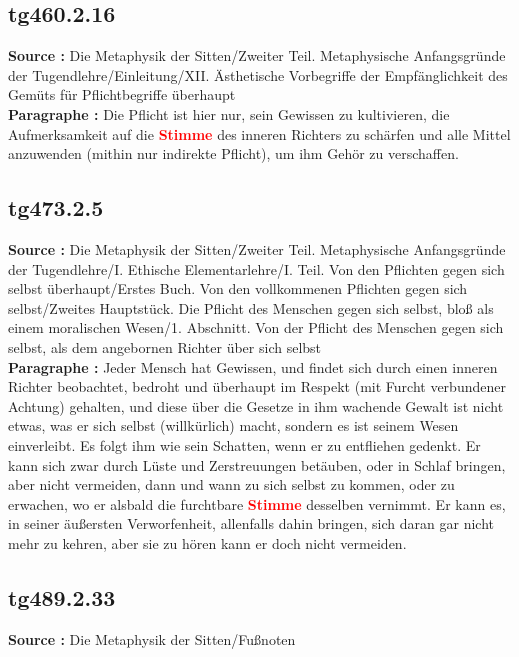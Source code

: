 \documentclass[a4paper,12pt,twoside]{book}
\newcommand{\match}[1]{\textcolor{red}{\textbf{#1}}}
\begin{document}
	\subsection*{tg460.2.16} 
	\textbf{Source : }Die Metaphysik der Sitten/Zweiter Teil. Metaphysische Anfangsgründe der Tugendlehre/Einleitung/XII. Ästhetische Vorbegriffe der Empfänglichkeit des Gemüts für Pflichtbegriffe überhaupt\\  
	
	\textbf{Paragraphe : }Die Pflicht ist hier nur, sein Gewissen zu kultivieren, die Aufmerksamkeit auf die \match{Stimme} des inneren Richters zu schärfen und alle Mittel anzuwenden (mithin nur indirekte Pflicht), um ihm Gehör zu verschaffen. 
	
	\subsection*{tg473.2.5} 
	\textbf{Source : }Die Metaphysik der Sitten/Zweiter Teil. Metaphysische Anfangsgründe der Tugendlehre/I. Ethische Elementarlehre/I. Teil. Von den Pflichten gegen sich selbst überhaupt/Erstes Buch. Von den vollkommenen Pflichten gegen sich selbst/Zweites Hauptstück. Die Pflicht des Menschen gegen sich selbst, bloß als einem moralischen Wesen/1. Abschnitt. Von der Pflicht des Menschen gegen sich selbst, als dem angebornen Richter über sich selbst\\  
	
	\textbf{Paragraphe : }Jeder Mensch hat Gewissen, und findet sich durch einen inneren Richter beobachtet, bedroht und überhaupt im Respekt (mit Furcht verbundener Achtung) gehalten, und diese über die Gesetze in ihm wachende Gewalt ist nicht etwas, was er sich selbst (willkürlich) macht, sondern es ist seinem Wesen einverleibt. Es folgt ihm wie sein Schatten, wenn er zu entfliehen gedenkt. Er kann sich zwar durch Lüste und Zerstreuungen betäuben, oder in Schlaf bringen, aber nicht vermeiden, dann und wann zu sich selbst zu kommen, oder zu erwachen, wo er alsbald die furchtbare \match{Stimme} desselben vernimmt. Er kann es, in seiner äußersten Verworfenheit, allenfalls dahin bringen, sich daran gar nicht mehr zu kehren, aber sie zu hören kann er doch nicht vermeiden. 
	
	\subsection*{tg489.2.33} 
	\textbf{Source : }Die Metaphysik der Sitten/Fußnoten\\  
	
\end{document}
